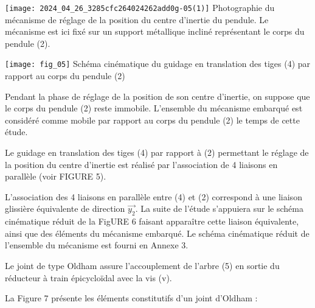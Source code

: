 \begin{minipage}[c]{.45\linewidth}
    \texttt{[image: 2024\_04\_26\_3285cfc264024262add0g-05(1)]}
     {\label{ccmp2023_fig_04} Photographie du mécanisme de réglage de la position du centre d'inertie du pendule. Le mécanisme est ici fixé sur un support métallique incliné représentant le corps du pendule (2).}
\end{minipage}
\hfill
\begin{minipage}[c]{.45\linewidth}
        \texttt{[image: fig\_05]}
         {\label{ccmp2023_fig_05} Schéma cinématique du guidage en translation des tiges (4) par rapport au corps du pendule (2)}
\end{minipage}


Pendant la phase de réglage de la position de son centre d'inertie, on suppose que le corps du pendule (2) reste immobile. L'ensemble du mécanisme embarqué est considéré comme mobile par rapport au corps du pendule (2) le temps de cette étude.

Le guidage en translation des tiges (4) par rapport à (2) permettant le réglage de la position du centre d'inertie est réalisé par l'association de 4 liaisons en parallèle (voir FIGURE 5).




L'association des 4 liaisons en parallèle entre (4) et (2) correspond à une liaison glissière équivalente de direction $\overrightarrow{y_{2}}$. La suite de l'étude s'appuiera sur le schéma cinématique réduit de la FigURE 6 faisant apparaître cette liaison équivalente, ainsi que des éléments du mécanisme embarqué. Le schéma cinématique réduit de l'ensemble du mécanisme est fourni en Annexe 3.

Le joint de type Oldham assure l'accouplement de l'arbre (5) en sortie du réducteur à train épicycloïdal avec la vis (v).

La Figure 7 présente les éléments constitutifs d'un joint d'Oldham :

